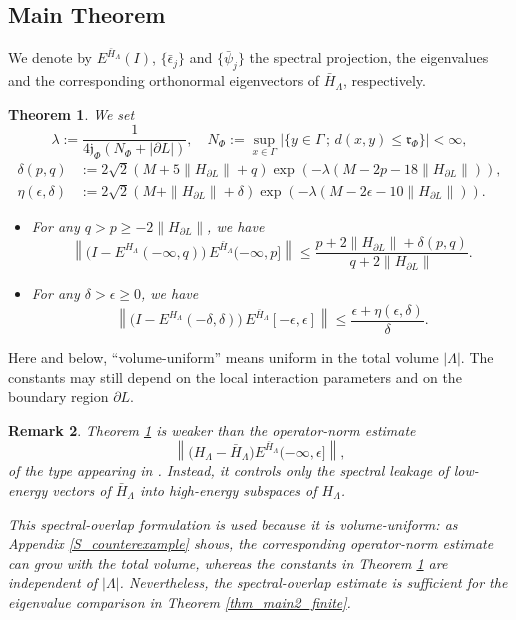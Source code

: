 \documentclass[11pt]{article}
\numberwithin{equation}{section}
\newtheorem{theorem}{Theorem}[section]
\newtheorem{remark}[theorem]{Remark}
\begin{document}
\subsection{Main Theorem}
We denote by $E^{\bar{H}_\Lambda}(I)$, $\{\bar{\epsilon}_j\}$ and $\{\bar{\psi}_j\}$ the spectral projection, the eigenvalues and the corresponding orthonormal eigenvectors of $\bar{H}_\Lambda$, respectively.

\begin{theorem}\label{thm_main_finite}
We set
\[
\lambda:=\frac{1}{4\mathfrak{j}_\Phi(N_\Phi+|\partial L|)},\quad N_\Phi:=\sup_{x\in\Gamma} |\{ y\in\Gamma \,;\, d(x,y)\leq \mathfrak{r}_\Phi\}|<\infty,
\]
\begin{align*}
\delta(p,q)&:=2\sqrt{2}(M+5\|H_{\partial L}\|+q) \exp(-\lambda(M-2p-18\|H_{\partial L}\|)),\\
\eta(\epsilon,\delta)&:=2\sqrt{2}(M+\|H_{\partial L}\|+\delta) \exp(-\lambda(M-2\epsilon-10\|H_{\partial L}\|)).
\end{align*}
\begin{itemize}
\item[(i)] For any $q>p\geq-2\|H_{\partial L}\|$, we have
\[
\left\|\Big(I-E^{H_\Lambda}(-\infty,q)\Big)\,
E^{\bar{H}_\Lambda}(-\infty,p]\right\|
\leq\frac{p+2\|H_{\partial L}\|+\delta(p,q)}{q+2\|H_{\partial L}\|}.
\]
\item[(ii)] For any $\delta>\epsilon\geq0$, we have
\[
\left\|\Big(I-E^{H_\Lambda}(-\delta,\delta)\Big)\,
E^{\bar{H}_\Lambda}[-\epsilon,\epsilon]\right\|
\leq\frac{\epsilon+\eta(\epsilon,\delta)}{\delta}.
\]
\end{itemize}
\end{theorem}

Here and below, ``volume-uniform'' means uniform in the total volume $|\Lambda|$.  The constants may still depend on the local interaction parameters and on the boundary region $\partial L$.

\begin{remark}
Theorem \ref{thm_main_finite} is weaker than the operator-norm estimate
\[
\left\|\bigl(H_\Lambda-\bar H_\Lambda\bigr)
E^{\bar H_\Lambda}(-\infty,\epsilon]\right\|,
\]
of the type appearing in \cite[Theorem 2.6]{Arad-Kuwahara-Landau 2016}. 
Instead, it controls only the spectral leakage of low-energy vectors of $\bar{H}_\Lambda$ into high-energy subspaces of $H_\Lambda$.

This spectral-overlap formulation is used because it is volume-uniform: as Appendix \ref{S_counterexample} shows, the corresponding operator-norm estimate can grow with the total volume, whereas the constants in Theorem \ref{thm_main_finite} are independent of $|\Lambda|$. Nevertheless, the spectral-overlap estimate is sufficient for the eigenvalue comparison in Theorem \ref{thm_main2_finite}.
\end{remark}
\end{document}
